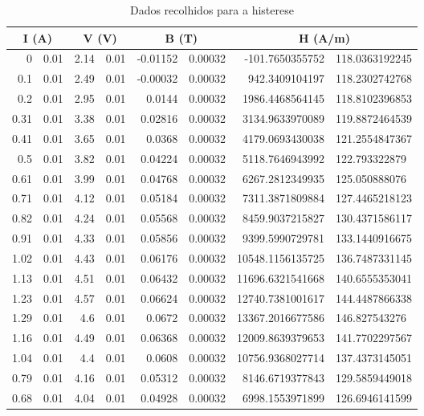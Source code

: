 \documentclass[a4paper]{article}
\begin{document}
\begin{table}[htbp]
\center
\caption{Dados recolhidos para a histerese}
\begin{tabular}{rlrlrlrl}
\hline
\multicolumn{ 2}{c}{I (A)} & \multicolumn{ 2}{c}{V (V)} & \multicolumn{ 2}{c}{B (T)} & \multicolumn{ 2}{c}{H (A/m)} \\ \hline
    0     & 0.01 & 2.14 & 0.01 & -0.01152 & 0.00032 & -101.7650355752   & 118.0363192245 \\
    0.1   & 0.01 & 2.49 & 0.01 & -0.00032 & 0.00032 & 942.3409104197    & 118.2302742768 \\
    0.2   & 0.01 & 2.95 & 0.01 & 0.0144   & 0.00032 & 1986.4468564145   & 118.8102396853 \\
    0.31  & 0.01 & 3.38 & 0.01 & 0.02816  & 0.00032 & 3134.9633970089   & 119.8872464539 \\
    0.41  & 0.01 & 3.65 & 0.01 & 0.0368   & 0.00032 & 4179.0693430038   & 121.2554847367 \\
    0.5   & 0.01 & 3.82 & 0.01 & 0.04224  & 0.00032 & 5118.7646943992   & 122.793322879  \\
    0.61  & 0.01 & 3.99 & 0.01 & 0.04768  & 0.00032 & 6267.2812349935   & 125.050888076  \\
    0.71  & 0.01 & 4.12 & 0.01 & 0.05184  & 0.00032 & 7311.3871809884   & 127.4465218123 \\
    0.82  & 0.01 & 4.24 & 0.01 & 0.05568  & 0.00032 & 8459.9037215827   & 130.4371586117 \\
    0.91  & 0.01 & 4.33 & 0.01 & 0.05856  & 0.00032 & 9399.5990729781   & 133.1440916675 \\
    1.02  & 0.01 & 4.43 & 0.01 & 0.06176  & 0.00032 & 10548.1156135725  & 136.7487331145 \\
    1.13  & 0.01 & 4.51 & 0.01 & 0.06432  & 0.00032 & 11696.6321541668  & 140.6555353041 \\
    1.23  & 0.01 & 4.57 & 0.01 & 0.06624  & 0.00032 & 12740.7381001617  & 144.4487866338 \\
    1.29  & 0.01 & 4.6  & 0.01 & 0.0672   & 0.00032 & 13367.2016677586  & 146.827543276  \\
    1.16  & 0.01 & 4.49 & 0.01 & 0.06368  & 0.00032 & 12009.8639379653  & 141.7702297567 \\
    1.04  & 0.01 & 4.4  & 0.01 & 0.0608   & 0.00032 & 10756.9368027714  & 137.4373145051 \\
    0.79  & 0.01 & 4.16 & 0.01 & 0.05312  & 0.00032 & 8146.6719377843   & 129.5859449018 \\
    0.68  & 0.01 & 4.04 & 0.01 & 0.04928  & 0.00032 & 6998.1553971899   & 126.6946141599 \\

\end{tabular}
\end{table}
\end{document}
